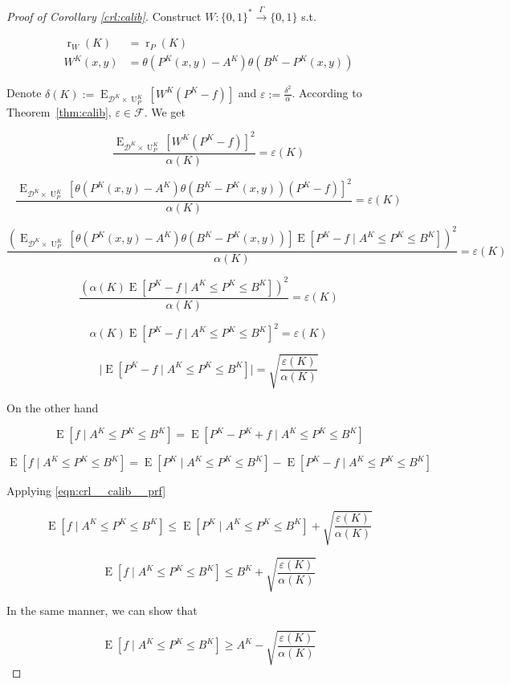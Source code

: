 \documentclass{article}
\numberwithin{equation}{section}
\theoremstyle{definition}
\theoremstyle{plain}
\newcommand{\Bool}{\{0,1\}}
\newcommand{\Words}{{\Bool^*}}
\DeclareMathOperator{\E}{E}
\DeclareMathOperator{\R}{r}
\DeclareMathOperator{\Un}{U}
\newcommand{\Abs}[1]{\lvert #1 \rvert}
\newcommand{\Dist}{\mathcal{D}}
\newcommand{\Fall}{\mathcal{F}}
\newcommand{\Scheme}{\xrightarrow{\Gamma}}
\begin{document}
\begin{proof}[Proof of Corollary \ref{crl:calib}]

Construct $W: \Words \Scheme \Bool$ s.t. 

\begin{align*}
\R_W(K) &= \R_P(K) \\
W^{K}(x,y)&=\theta(P^{K}(x,y)-A^{K})\theta(B^{K}-P^{K}(x,y))
\end{align*}

Denote $\delta(K):=\E_{\Dist^{K} \times \Un_P^{K}}[W^{K}(P^{K}-f)]$ and $\varepsilon:=\frac{\delta^2}{\alpha}$. According to Theorem~\ref{thm:calib}, $\varepsilon \in \Fall$.
We get

$$\frac{\E_{\Dist^{K} \times \Un_P^{K}}[W^{K}(P^{K}-f)]^2}{\alpha(K)} = \varepsilon(K)$$

$$\frac{\E_{\Dist^{K} \times \Un_P^{K}}[\theta(P^{K}(x,y)-A^{K})\theta(B^{K}-P^{K}(x,y))(P^{K}-f)]^2}{\alpha(K)} = \varepsilon(K)$$

$$\frac{(\E_{\Dist^{K} \times \Un_P^{K}}[\theta(P^{K}(x,y)-A^{K})\theta(B^{K}-P^{K}(x,y))]\E[P^{K}-f \mid A^{K} \leq P^{K} \leq B^{K}])^2}{\alpha(K)} = \varepsilon(K)$$

$$\frac{(\alpha(K)\E[P^{K}-f \mid A^{K} \leq P^{K} \leq B^{K}])^2}{\alpha(K)} = \varepsilon(K)$$

$$\alpha(K)\E[P^{K}-f \mid A^{K} \leq P^{K} \leq B^{K}]^2 = \varepsilon(K)$$

\begin{equation}
\label{eqn:crl__calib__prf}
\Abs{\E[P^{K}-f \mid A^{K} \leq P^{K} \leq B^{K}]} = \sqrt{\frac{\varepsilon(K)}{\alpha(K)}}
\end{equation}

On the other hand

$$\E[f \mid A^{K} \leq P^{K} \leq B^{K}] = \E[P^{K}-P^{K}+f \mid A^{K} \leq P^{K} \leq B^{K}]$$

$$\E[f \mid A^{K} \leq P^{K} \leq B^{K}] = \E[P^{K} \mid A^{K} \leq P^{K} \leq B^{K}]-\E[P^{K}-f \mid A^{K} \leq P^{K} \leq B^{K}]$$

Applying \ref{eqn:crl__calib__prf}

$$\E[f \mid A^{K} \leq P^{K} \leq B^{K}] \leq \E[P^{K} \mid A^{K} \leq P^{K} \leq B^{K}]+\sqrt{\frac{\varepsilon(K)}{\alpha(K)}}$$


$$\E[f \mid A^{K} \leq P^{K} \leq B^{K}] \leq B^{K} + \sqrt{\frac{\varepsilon(K)}{\alpha(K)}}$$

In the same manner, we can show that

$$\E[f \mid A^{K} \leq P^{K} \leq B^{K}] \geq A^{K} - \sqrt{\frac{\varepsilon(K)}{\alpha(K)}}$$
\end{proof}
\end{document}
